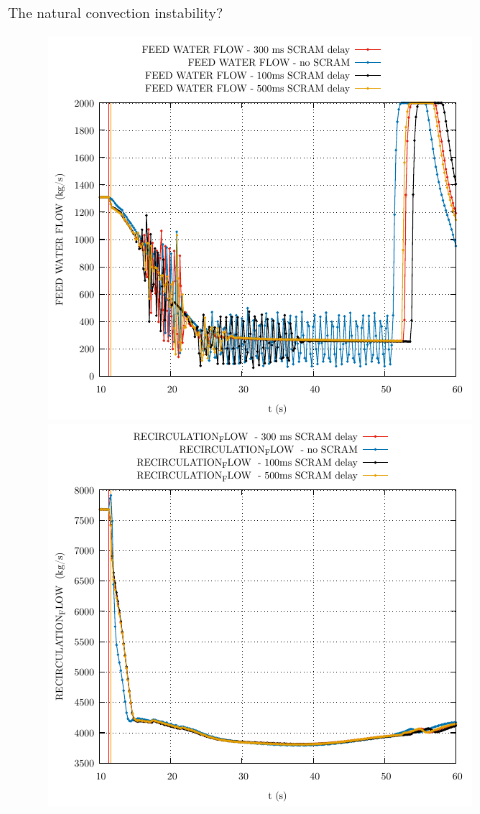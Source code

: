 %
\begin{frame}{The natural convection instability?}
	\begin{figure}
	\centering
	\begin{minipage}{.5\textwidth}
		\centering
		\includegraphics[width=0.7\linewidth]{./graphs/FEED WATER FLOW_comp.pdf}
	\end{minipage}%
	\begin{minipage}{.5\textwidth}
		\centering
		\includegraphics[width=.7\linewidth]{./graphs/RECIRCULATION_FLOW _comp.pdf}
	\end{minipage}
\end{figure}
\vspace{-10pt}
%		
%		
	
\end{frame}




